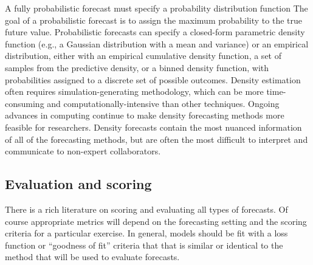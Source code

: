 \documentclass[a4paper]{article}
\newcommand{\ie}{\textit{i}.\textit{e}. }
\begin{document}
A fully probabilistic forecast must specify a probability distribution function
The goal of a probabilistic forecast is to assign the maximum probability to the true future value.
Probabilistic forecasts can specify a closed-form parametric density function (e.g., a Gaussian distribution with a mean and variance) or an empirical distribution, either with an empirical cumulative density function, a set of samples from the predictive density, or a binned density function, with probabilities assigned to a discrete set of possible outcomes.
Density estimation often requires simulation-generating methodology, which can be more time-consuming and computationally-intensive than other techniques.
Ongoing advances in computing continue to make density forecasting methods more feasible for researchers.
Density forecasts contain the most nuanced information of all of the forecasting methods, but are often the most difficult to interpret and communicate to non-expert collaborators.  

\subsection{Evaluation and scoring}
\label{subsec:eval}


There is a rich literature on scoring and evaluating all types of forecasts.
Of course appropriate metrics will depend on the forecasting setting and the scoring criteria for a particular exercise. 
In general, models should be fit with a loss function or ``goodness of fit'' criteria that that is similar or identical to the method that will be used to evaluate forecasts.
\end{document}
